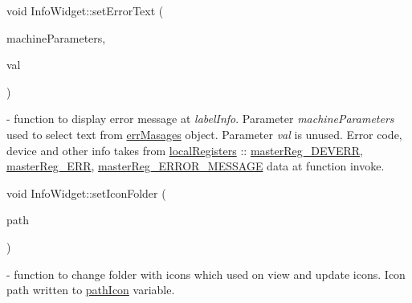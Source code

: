 \mbox{\label{classInfoWidget_ab17f6cd1820b6946d72c6a42ea3f914b}} 
{\footnotesize\ttfamily void Info\+Widget\+::\texorpdfstring{set\+Error\+Text}{setErrorText} (\begin{DoxyParamCaption}\item[{\mbox{\hyperlink{classMachineSettings_a87879e13793dbc7c10d4fa18e1236751}{Machine\+Settings\+::\+Machine\+Parameters}}}]{machine\+Parameters,  }\item[{\mbox{\hyperlink{settings_8h_a017dd44e68049ffdd31500a8cd01ba68}{uint16\+\_\+t}}}]{val }\end{DoxyParamCaption})} - function to display error message at \textit{labelInfo}. Parameter \textit{machine\+Parameters} used to select text from \hyperlink{classInfoWidget_a823b30e65e7e903ad07ae4decc13330d}{err\+Masages} object. Parameter \textit{val} is unused. Error code, device and other info takes from \hyperlink{classInfoWidget_a410514814006364f1abb4ce70e15ea90}{local\+Registers} :: \hyperlink{classRegister_a109eaf7556eeb67fb1266f2c4be4477ea9bc9f7f42bfc308c9d4d852c34f88266}{master\+Reg\+\_\+\+D\+E\+V\+E\+RR}, \hyperlink{classRegister_a109eaf7556eeb67fb1266f2c4be4477ea8fe2c7e24469c241f73e0e8c4479df5f}{master\+Reg\+\_\+\+E\+RR}, \hyperlink{classRegister_a109eaf7556eeb67fb1266f2c4be4477ea24c2d649cc95e68e1469708ca96ba048}{master\+Reg\+\_\+\+E\+R\+R\+O\+R\+\_\+\+M\+E\+S\+S\+A\+GE} data at function invoke.

\mbox{\label{classInfoWidget_a3ff137f58223343fa7ae5b09218a0185}} 
{\footnotesize\ttfamily void Info\+Widget\+::\texorpdfstring{set\+Icon\+Folder}{setIconFolder} (\begin{DoxyParamCaption}\item[{Q\+String}]{path }\end{DoxyParamCaption})} - function to change folder with icons which used on view and update icons. Icon path written to \hyperlink{classInfoWidget_ae0bf133d0a2f93b0536a47fcdad1fbe7}{path\+Icon} variable.

